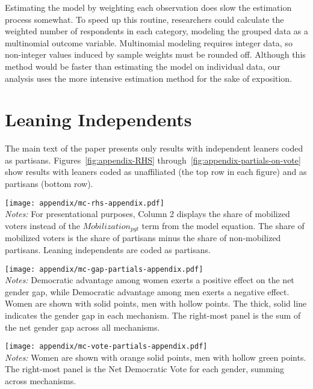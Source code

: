 \documentclass[12pt
               ,final
               ]{article}
\newcommand{\notes}[1]{\\
\small
\emph{Notes:} #1}
\begin{document}
Estimating the model by weighting each observation does slow the estimation process somewhat. To speed up this routine, researchers could calculate the weighted number of respondents in each category, modeling the grouped data as a multinomial outcome variable. Multinomial modeling requires integer data, so non-integer values induced by sample weights must be rounded off. Although this method would be faster than estimating the model on individual data, our analysis uses the more intensive estimation method for the sake of exposition.





\section*{Leaning Independents}

The main text of the paper presents only results with independent leaners coded as partisans. Figures~\ref{fig:appendix-RHS} through~\ref{fig:appendix-partials-on-vote} show results with leaners coded as unaffiliated (the top row in each figure) and as partisans (bottom row).


\begin{sidewaysfigure}[p]
  \centering
  \caption{Measures of Mobilization, Persuasion, and Voting by the Unaffiliated 1952-2012}
  \texttt{[image: appendix/mc-rhs-appendix.pdf]}
  \label{fig:appendix-RHS}
  \notes{For presentational purposes, Column 2 displays the share of mobilized voters instead of the $\mathit{Mobilization}_{pgt}$ term from the model equation. The share of mobilized voters is the share of partisans minus the share of non-mobilized partisans. Leaning independents are coded as partisans.}
\end{sidewaysfigure}




\begin{sidewaysfigure}[p]
  \centering
  \caption{How Each Mechanism Affects the Gender Gap}
  \label{fig:appendix-partials-on-gap}
  \texttt{[image: appendix/mc-gap-partials-appendix.pdf]}
  \notes{Democratic advantage among women exerts a positive effect on the net gender gap, while Democratic advantage among men exerts a negative effect. Women are shown with solid points, men with hollow points. The thick, solid line indicates the gender gap in each mechanism. The right-most panel is the sum of the net gender gap across all mechanisms.}
\end{sidewaysfigure}



\begin{sidewaysfigure}[p]
   \centering
   \caption{Relating the Gender Gap and the Election Outcome: Gender differences in the sources of Democratic votes}
   \label{fig:appendix-partials-on-vote}
   \texttt{[image: appendix/mc-vote-partials-appendix.pdf]}
   \notes{Women are shown with orange solid points, men with hollow green points.  The right-most panel is the Net Democratic Vote for each gender, summing across mechanisms.}
\end{sidewaysfigure}


\FloatBarrier


\end{document}
